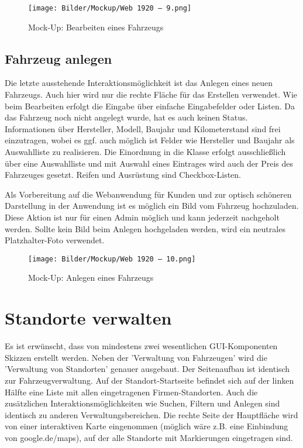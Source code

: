\begin{figure}[!ht]
    \centering
    \texttt{[image: Bilder/Mockup/Web 1920 – 9.png]}
    \caption{Mock-Up: Bearbeiten eines Fahrzeugs}
    \label{mu:bearbeiten}
\end{figure}

\newpage

\subsection{Fahrzeug anlegen}

Die letzte ausstehende Interaktionsmöglichkeit ist das Anlegen eines neuen Fahrzeugs. Auch hier wird nur die rechte Fläche für das Erstellen verwendet. Wie beim Bearbeiten erfolgt die Eingabe über einfache Eingabefelder oder Listen. Da das Fahrzeug noch nicht angelegt wurde, hat es auch keinen Status. Informationen über Hersteller, Modell, Baujahr und Kilometerstand sind frei einzutragen, wobei es ggf. auch möglich ist Felder wie Hersteller und Baujahr als Auswahlliste zu realisieren. Die Einordnung in die Klasse erfolgt ausschließlich über eine Auswahlliste und mit Auswahl eines Eintrages wird auch der Preis des Fahrzeuges gesetzt. Reifen und Ausrüstung sind Checkbox-Listen. 

Als Vorbereitung auf die Webanwendung für Kunden und zur optisch schöneren Darstellung in der Anwendung ist es möglich ein Bild vom Fahrzeug hochzuladen. Diese Aktion ist nur für einen Admin möglich und kann jederzeit nachgeholt werden. Sollte kein Bild beim Anlegen hochgeladen werden, wird ein neutrales Platzhalter-Foto verwendet. 

\begin{figure}[!ht]
    \centering
    \texttt{[image: Bilder/Mockup/Web 1920 – 10.png]}
    \caption{Mock-Up: Anlegen eines Fahrzeugs}
    \label{mu:anlegen}
\end{figure}

\section{Standorte verwalten}

Es ist erwünscht, dass von mindestens zwei wesentlichen GUI-Komponenten Skizzen erstellt werden. Neben der 'Verwaltung von Fahrzeugen' wird die 'Verwaltung von Standorten' genauer ausgebaut. Der Seitenaufbau ist identisch zur Fahrzeugverwaltung. Auf der Standort-Startseite befindet sich auf der linken Hälfte eine Liste mit allen eingetragenen Firmen-Standorten. Auch die zusätzlichen Interaktionsmöglichkeiten wie Suchen, Filtern und Anlegen sind identisch zu anderen Verwaltungsbereichen. Die rechte Seite der Hauptfläche wird von einer interaktiven Karte eingenommen (möglich wäre z.B. eine Einbindung von google.de/maps), auf der alle Standorte mit Markierungen eingetragen sind. 

